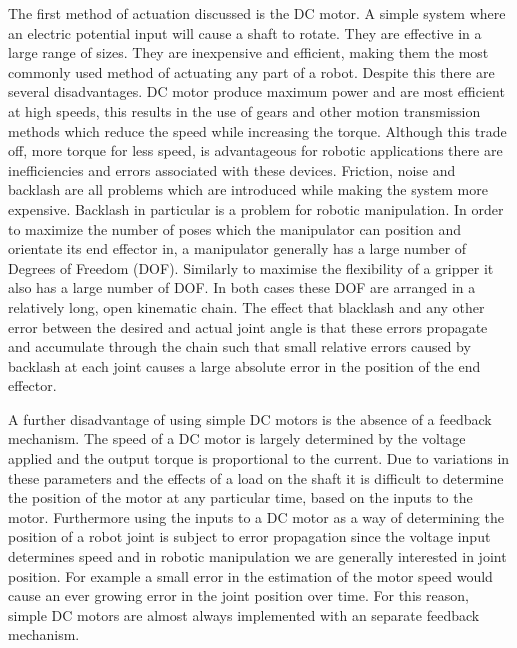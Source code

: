 The first method of actuation discussed is the DC motor. A simple system where an electric potential input will cause a shaft to rotate. They are effective in a large range of sizes. They are inexpensive and efficient, making them the most commonly used method of actuating any part of a robot. Despite this there are several disadvantages. DC motor produce maximum power and are most efficient at high speeds, this results in the use of gears and other motion transmission methods which reduce the speed while increasing the torque. Although this trade off, more torque for less speed, is advantageous for robotic applications there are inefficiencies and errors associated with these devices. Friction, noise and backlash are all problems which are introduced while making the system more expensive. Backlash in particular is a problem for robotic manipulation. In order to maximize the number of poses which the manipulator can position and orientate its end effector in, a manipulator generally has a large number of Degrees of Freedom (DOF). Similarly to maximise the flexibility of a gripper it also has a large number of DOF. In both cases these DOF are arranged in a relatively long, open kinematic chain. The effect that blacklash and any other error between the desired and actual joint angle is that these errors propagate and accumulate through the chain such that small relative errors caused by backlash at each joint causes a large absolute error in the position of the end effector.


A further disadvantage of using simple DC motors is the absence of a feedback mechanism. The speed of a DC motor is largely determined by the voltage applied and the output torque is proportional to the current. Due to variations in these parameters and the effects of a load on the shaft it is difficult to determine the position of the motor at any particular time, based on the inputs to the motor. Furthermore using the inputs to a DC motor as a way of determining the position of a robot joint is subject to error propagation since the voltage input determines speed and in robotic manipulation we are generally interested in joint position. For example a small error in the estimation of the motor speed would cause an ever growing error in the joint position over time. For this reason, simple DC motors are almost always implemented with an separate feedback mechanism.

